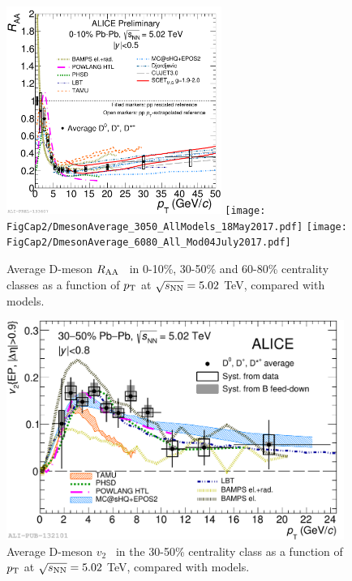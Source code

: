 \begin{figure}[!ht]
  \centering
    \includegraphics[width=7cm]{FigCap2/2017-Jul-07-DmesonAverage_010_All_Models_04July2017.pdf}
    \texttt{[image: FigCap2/DmesonAverage\_3050\_AllModels\_18May2017.pdf]}
    \texttt{[image: FigCap2/DmesonAverage\_6080\_All\_Mod04July2017.pdf]}
  \caption{Average D-meson $R_{\rm AA}$~\cite{ALICE-PUBLIC-2017-003} in 0-10\%, 30-50\% and 60-80\% centrality classes as a function of $p_{\rm T}$ at $\sqrt{s_{\rm NN}} = 5.02$ TeV, compared with models.}
  \label{fig:RAAandv2}
\end{figure}



\begin{figure}[!ht]
  \centering
    \includegraphics[width=11cm]{FigCap2/2017-Jul-04-DmesonComparisonWithModels.pdf}
  \caption{Average D-meson $v_2$~\cite{Acharya:2017qps} in the 30-50\% centrality class as a function of $p_{\rm T}$ at $\sqrt{s_{\rm NN}} = 5.02$ TeV, compared with models.}
  \label{fig:RAAandv2}
\end{figure}

